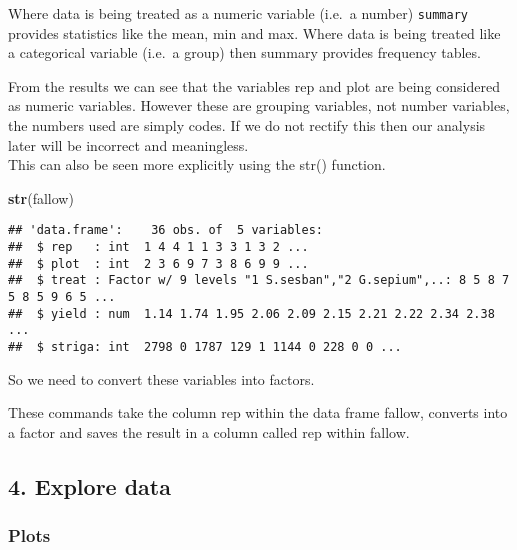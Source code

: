 \documentclass[]{book}
\newenvironment{Shaded}{\begin{snugshade}}{\end{snugshade}}
\newcommand{\KeywordTok}[1]{\textcolor[rgb]{0.13,0.29,0.53}{\textbf{#1}}}
\newcommand{\OperatorTok}[1]{\textcolor[rgb]{0.81,0.36,0.00}{\textbf{#1}}}
\newcommand{\NormalTok}[1]{#1}
\theoremstyle{definition}
\theoremstyle{definition}
\theoremstyle{definition}
\theoremstyle{remark}
\begin{document}
Where data is being treated as a numeric variable (i.e.~a number)
\texttt{summary} provides statistics like the mean, min and max. Where
data is being treated like a categorical variable (i.e.~a group) then
summary provides frequency tables.

From the results we can see that the variables rep and plot are being
considered as numeric variables. However these are grouping variables,
not number variables, the numbers used are simply codes. If we do not
rectify this then our analysis later will be incorrect and
meaningless.\\
This can also be seen more explicitly using the str() function.

\begin{Shaded}
\begin{Highlighting}[]
\KeywordTok{str}\NormalTok{(fallow)}
\end{Highlighting}
\end{Shaded}

\begin{verbatim}
## 'data.frame':    36 obs. of  5 variables:
##  $ rep   : int  1 4 4 1 1 3 3 1 3 2 ...
##  $ plot  : int  2 3 6 9 7 3 8 6 9 9 ...
##  $ treat : Factor w/ 9 levels "1 S.sesban","2 G.sepium",..: 8 5 8 7 5 8 5 9 6 5 ...
##  $ yield : num  1.14 1.74 1.95 2.06 2.09 2.15 2.21 2.22 2.34 2.38 ...
##  $ striga: int  2798 0 1787 129 1 1144 0 228 0 0 ...
\end{verbatim}

So we need to convert these variables into factors.

\begin{Shaded}
\end{Shaded}

These commands take the column rep within the data frame fallow,
converts into a factor and saves the result in a column called rep
within fallow.

\subsection{4. Explore data}\label{explore-data}

\subsubsection{Plots}\label{plots}
\end{document}
